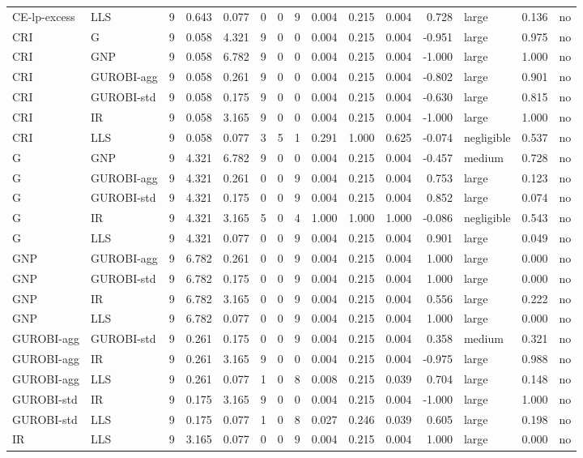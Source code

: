 \begin{table}[htbp]
\begin{tabular}{llrrrrrrrrrrlrr}
CE-lp-excess & LLS & 9 & 0.643 & 0.077 & 0 & 0 & 9 & 0.004 & 0.215 & 0.004 & 0.728 & large & 0.136 & no \\
CRI & G & 9 & 0.058 & 4.321 & 9 & 0 & 0 & 0.004 & 0.215 & 0.004 & -0.951 & large & 0.975 & no \\
CRI & GNP & 9 & 0.058 & 6.782 & 9 & 0 & 0 & 0.004 & 0.215 & 0.004 & -1.000 & large & 1.000 & no \\
CRI & GUROBI-agg & 9 & 0.058 & 0.261 & 9 & 0 & 0 & 0.004 & 0.215 & 0.004 & -0.802 & large & 0.901 & no \\
CRI & GUROBI-std & 9 & 0.058 & 0.175 & 9 & 0 & 0 & 0.004 & 0.215 & 0.004 & -0.630 & large & 0.815 & no \\
CRI & IR & 9 & 0.058 & 3.165 & 9 & 0 & 0 & 0.004 & 0.215 & 0.004 & -1.000 & large & 1.000 & no \\
CRI & LLS & 9 & 0.058 & 0.077 & 3 & 5 & 1 & 0.291 & 1.000 & 0.625 & -0.074 & negligible & 0.537 & no \\
G & GNP & 9 & 4.321 & 6.782 & 9 & 0 & 0 & 0.004 & 0.215 & 0.004 & -0.457 & medium & 0.728 & no \\
G & GUROBI-agg & 9 & 4.321 & 0.261 & 0 & 0 & 9 & 0.004 & 0.215 & 0.004 & 0.753 & large & 0.123 & no \\
G & GUROBI-std & 9 & 4.321 & 0.175 & 0 & 0 & 9 & 0.004 & 0.215 & 0.004 & 0.852 & large & 0.074 & no \\
G & IR & 9 & 4.321 & 3.165 & 5 & 0 & 4 & 1.000 & 1.000 & 1.000 & -0.086 & negligible & 0.543 & no \\
G & LLS & 9 & 4.321 & 0.077 & 0 & 0 & 9 & 0.004 & 0.215 & 0.004 & 0.901 & large & 0.049 & no \\
GNP & GUROBI-agg & 9 & 6.782 & 0.261 & 0 & 0 & 9 & 0.004 & 0.215 & 0.004 & 1.000 & large & 0.000 & no \\
GNP & GUROBI-std & 9 & 6.782 & 0.175 & 0 & 0 & 9 & 0.004 & 0.215 & 0.004 & 1.000 & large & 0.000 & no \\
GNP & IR & 9 & 6.782 & 3.165 & 0 & 0 & 9 & 0.004 & 0.215 & 0.004 & 0.556 & large & 0.222 & no \\
GNP & LLS & 9 & 6.782 & 0.077 & 0 & 0 & 9 & 0.004 & 0.215 & 0.004 & 1.000 & large & 0.000 & no \\
GUROBI-agg & GUROBI-std & 9 & 0.261 & 0.175 & 0 & 0 & 9 & 0.004 & 0.215 & 0.004 & 0.358 & medium & 0.321 & no \\
GUROBI-agg & IR & 9 & 0.261 & 3.165 & 9 & 0 & 0 & 0.004 & 0.215 & 0.004 & -0.975 & large & 0.988 & no \\
GUROBI-agg & LLS & 9 & 0.261 & 0.077 & 1 & 0 & 8 & 0.008 & 0.215 & 0.039 & 0.704 & large & 0.148 & no \\
GUROBI-std & IR & 9 & 0.175 & 3.165 & 9 & 0 & 0 & 0.004 & 0.215 & 0.004 & -1.000 & large & 1.000 & no \\
GUROBI-std & LLS & 9 & 0.175 & 0.077 & 1 & 0 & 8 & 0.027 & 0.246 & 0.039 & 0.605 & large & 0.198 & no \\
IR & LLS & 9 & 3.165 & 0.077 & 0 & 0 & 9 & 0.004 & 0.215 & 0.004 & 1.000 & large & 0.000 & no \\
\bottomrule
\end{tabular}
\end{table}
